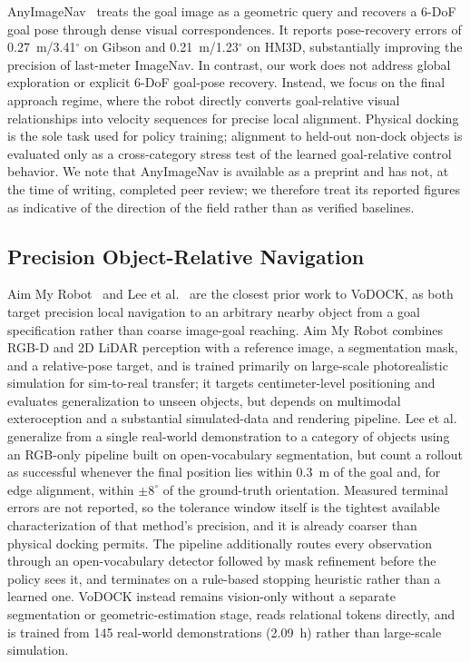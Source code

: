 \documentclass[letterpaper, 10 pt, conference]{IEEEtran}  %
\begin{document}
AnyImageNav~\cite{c2} treats the goal image as a geometric query and recovers a 6-DoF goal pose through dense visual correspondences. It reports pose-recovery errors of 0.27~m/3.41$^\circ$ on Gibson and 0.21~m/1.23$^\circ$ on HM3D, substantially improving the precision of last-meter ImageNav. In contrast, our work does not address global exploration or explicit 6-DoF goal-pose recovery. Instead, we focus on the final approach regime, where the robot directly converts goal-relative visual relationships into velocity sequences for precise local alignment. Physical docking is the sole task used for policy training; alignment to held-out non-dock objects is evaluated only as a cross-category stress test of the learned goal-relative control behavior. We note that AnyImageNav is available as a preprint and has not, at the time of writing, completed peer review; we therefore treat its reported figures as indicative of the direction of the field rather than as verified baselines.

\subsection{Precision Object-Relative Navigation}
Aim My Robot~\cite{meng2025aim} and Lee et al.~\cite{lee2026lastmeter} are the closest prior work to VoDOCK, as both target precision local navigation to an arbitrary nearby object from a goal specification rather than coarse image-goal reaching. Aim My Robot combines RGB-D and 2D LiDAR perception with a reference image, a segmentation mask, and a relative-pose target, and is trained primarily on large-scale photorealistic simulation for sim-to-real transfer; it targets centimeter-level positioning and evaluates generalization to unseen objects, but depends on multimodal exteroception and a substantial simulated-data and rendering pipeline. Lee et al. generalize from a single real-world demonstration to a category of objects using an RGB-only pipeline built on open-vocabulary segmentation, but count a rollout as successful whenever the final position lies within 0.3~m of the goal and, for edge alignment, within $\pm 8^\circ$ of the ground-truth orientation. Measured terminal errors are not reported, so the tolerance window itself is the tightest available characterization of that method's precision, and it is already coarser than physical docking permits. The pipeline additionally routes every observation through an open-vocabulary detector followed by mask refinement before the policy sees it, and terminates on a rule-based stopping heuristic rather than a learned one. VoDOCK instead remains vision-only without a separate segmentation or geometric-estimation stage, reads relational tokens directly, and is trained from 145 real-world demonstrations (2.09~h) rather than large-scale simulation.
\end{document}
